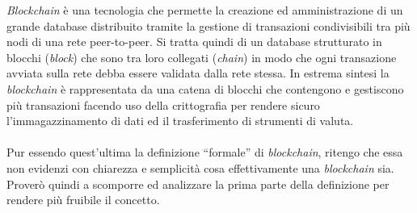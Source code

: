 \documentclass[11pt]{thesistemp}
\begin{document}
\textit{Blockchain} è una tecnologia che permette la creazione ed amministrazione di un grande database
distribuito tramite la gestione di transazioni condivisibili tra più nodi di una rete peer-to-peer.
Si tratta quindi di un database strutturato in blocchi (\textit{block}) che sono tra loro collegati (\textit{chain}) in modo che ogni transazione avviata sulla rete debba essere validata dalla rete stessa. 
In estrema sintesi la \textit{blockchain} è rappresentata da una catena di blocchi che
contengono e gestiscono più transazioni facendo uso della crittografia per rendere sicuro
l’immagazzinamento di dati ed il trasferimento di strumenti di valuta.\\\\
Pur essendo quest'ultima la definizione ``formale'' di \textit{blockchain}, ritengo che essa non evidenzi con chiarezza e semplicità cosa effettivamente una \textit{blockchain} sia.\\
Proverò quindi a scomporre ed analizzare la prima parte della definizione per rendere più fruibile il concetto.
\end{document}
